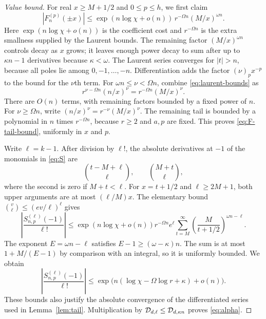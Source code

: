 \begin{proof}[Value bound]
For real $x\geq M+1/2$ and $0\leq p\leq h$, we first claim
\begin{equation}\label{eq:F-tail-bound}
 |F_n^{(p)}(\pm x)|
 \leq\exp(n\log\chi+o(n))\,r^{-\Omega n}(M/x)^{\omega n}.
\end{equation}
Here $\exp(n\log\chi+o(n))$ is the coefficient cost and
$r^{-\Omega n}$ is the extra smallness supplied by the Laurent bounds.
The remaining factor $(M/x)^{\omega n}$ controls decay as $x$ grows;
it leaves enough power decay to sum after up to $\kappa n-1$
derivatives because $\kappa<\omega$.
The Laurent series converges for $|t|>n$, because all poles lie among
$0,-1,\ldots,-n$. Differentiation adds the factor
$(\nu)_p x^{-p}$ to the bound for the $\nu$th term.
For $\omega n\leq\nu<\Omega n$, combine \eqref{eq:laurent-bounds} as
\[
 r^{\nu-\Omega n}(n/x)^\nu
       =r^{-\Omega n}(M/x)^\nu.
\]
There are $O(n)$ terms, with remaining factors bounded by a fixed power
of $n$. For $\nu\geq\Omega n$, write
$(n/x)^\nu=r^{-\nu}(M/x)^\nu$.
The remaining tail is bounded by a polynomial in $n$ times
$r^{-\Omega n}$, because $r\geq2$ and $a,p$ are fixed.
This proves \eqref{eq:F-tail-bound}, uniformly in $x$ and $p$.

Write $\ell=k-1$.
After division by $\ell!$, the absolute derivatives at $-1$ of the
monomials in \eqref{eq:S} are
\[
 \binom{t-M+\ell}{\ell},
 \qquad
 \binom{M+t}{\ell},
\]
where the second is zero if $M+t<\ell$.
For $x=t+1/2$ and $\ell\geq2M+1$, both upper arguments are at most
$(\ell/M)x$.
The elementary bound $\binom{v}{\ell}\leq(ev/\ell)^\ell$ gives
\[
 \left|\frac{S_{n,p}^{(\ell)}(-1)}{\ell!}\right|
 \leq \exp(n\log\chi+o(n))r^{-\Omega n}e^\ell
       \sum_{t=M}^{\infty}
           \left(\frac{M}{t+1/2}\right)^{\omega n-\ell}.
\]
The exponent $E=\omega n-\ell$ satisfies
$E-1\geq(\omega-\kappa)n$. The sum is at most
$1+M/(E-1)$ by comparison with an integral, so it is uniformly bounded.
We obtain
\[
 \left|\frac{S_{n,p}^{(\ell)}(-1)}{\ell!}\right|
 \leq\exp\bigl(n(\log\chi-\Omega\log r+\kappa)+o(n)\bigr).
\]
These bounds also justify the absolute convergence of the differentiated
series used in Lemma~\ref{lem:tail}. Multiplication by
$\mathcal D_{d,\ell}\leq\mathcal D_{d,\kappa n}$ proves \eqref{eq:alpha}.
\end{proof}

